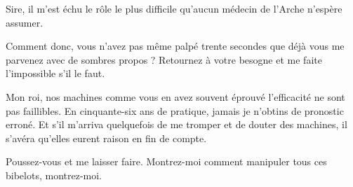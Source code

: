 \begin{drama}
  \medecinspeaks Sire, il m’est échu le rôle le plus difficile qu’aucun médecin de l’Arche n’espère assumer. 

  \roispeaks Comment donc, vous n’avez pas même palpé trente secondes que déjà vous me parvenez avec de sombres propos ? Retournez à votre besogne et me faite l’impossible s’il le faut.

  \medecinspeaks Mon roi, nos machines comme vous en avez souvent éprouvé l’efficacité ne sont pas faillibles. En cinquante-six ans de pratique, jamais je n’obtins de pronostic erroné. Et s’il m’arriva quelquefois de me tromper et de douter des machines, il s’avéra qu’elles eurent raison en fin de compte.

  \roispeaks {} Poussez-vous et me laisser faire.  Montrez-moi comment manipuler tous ces bibelots, montrez-moi.

\end{drama}


\scene

\StageDirII{\elena, \reine}



